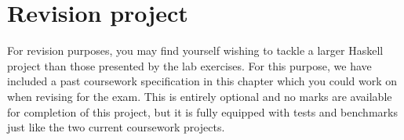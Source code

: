 \cleardoublepage
\chapter{Revision project}

For revision purposes, you may find yourself wishing to tackle a larger Haskell project than those presented by the lab exercises. For this purpose, we have included a past coursework specification in this chapter which you could work on when revising for the exam. This is entirely optional and no marks are available for completion of this project, but it is fully equipped with tests and benchmarks just like the two current coursework projects.


